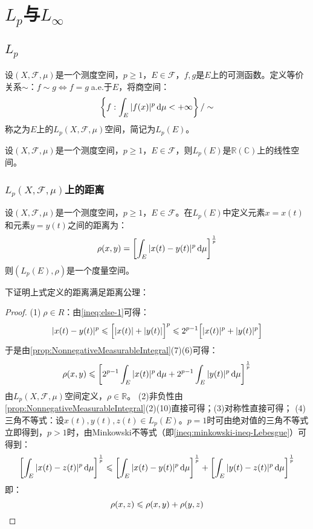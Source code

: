 \section{$L_p$与$L_{\infty}$}

\subsection{$L_p$}
\begin{definition}
	设$(X,\mathscr{F},\mu)$是一个测度空间，$p\geqslant1$，$E\in\mathscr{F}$，$f,g$是$E$上的可测函数。定义等价关系$\sim$：$f\sim g\Leftrightarrow f=g\;$a.e.于$E$，将商空间：
	\begin{equation*}
		\left\{f:\int_{E}|f(x)|^p\mathop{}\!\mathrm{d}\mu<+\infty\right\}/\sim
	\end{equation*}
	称之为$E$上的$L_p(X,\mathscr{F},\mu)$空间，简记为$L_p(E)$。
\end{definition}
\begin{property}\label{prop:Lp}
	设$(X,\mathscr{F},\mu)$是一个测度空间，$p\geqslant1$，$E\in\mathscr{F}$，则$L_p(E)$是$\mathbb{R}(\mathbb{C})$上的线性空间。
\end{property}
\subsubsection{$L_p(X,\mathscr{F},\mu)$上的距离}
\begin{definition}
	设$(X,\mathscr{F},\mu)$是一个测度空间，$p\geqslant1$，$E\in\mathscr{F}$。在$L_p(E)$中定义元素$x=x(t)$和元素$y=y(t)$之间的距离为：
	\begin{equation*}
		\rho(x,y)=\left[\int_{E}|x(t)-y(t)|^p\mathop{}\!\mathrm{d}\mu\right]^\frac{1}{p}
	\end{equation*}
	则$(L_p(E),\rho)$是一个度量空间。
\end{definition}
下证明上式定义的距离满足距离公理：
\begin{proof}
	(1)$\;\rho\in R$：由\cref{ineq:else-1}可得：
	\begin{equation*}
		|x(t)-y(t)|^p\leqslant\Bigl[|x(t)|+|y(t)|\Bigr]^p\leqslant2^{p-1}\Bigl[|x(t)|^p+|y(t)|^p\Bigr]
	\end{equation*}
	于是由\cref{prop:NonnegativeMeasurableIntegral}(7)(6)可得：
	\begin{equation*}
		\rho(x,y)\leqslant\left[2^{p-1}\int_{E}|x(t)|^p\mathop{}\!\mathrm{d}\mu+2^{p-1}\int_{E}|y(t)|^p\mathop{}\!\mathrm{d}\mu\right]^{\frac{1}{p}}
	\end{equation*}
	由$L_p(X,\mathscr{F},\mu)$空间定义，$\rho\in\mathbb{R}$。
	(2)非负性由\cref{prop:NonnegativeMeasurableIntegral}(2)(10)直接可得；(3)对称性直接可得；
	(4)三角不等式：设$x(t),y(t),z(t)\in L_p(E)$。$p=1$时可由绝对值的三角不等式立即得到，$p>1$时，由Minkowski不等式（即\cref{ineq:minkowski-ineq-Lebesgue}）可得到：
	\begin{equation*}
		\left[\int_{E}|x(t)-z(t)|^p\mathop{}\!\mathrm{d}\mu\right]^{\frac{1}{p}} \leqslant \left[\int_{E}|x(t)-y(t)|^p\mathop{}\!\mathrm{d}\mu\right]^{\frac{1}{p}} + \left[\int_{E}|y(t)-z(t)|^p\mathop{}\!\mathrm{d}\mu\right]^{\frac{1}{p}}
	\end{equation*}
	即：
	\begin{equation*}
		\rho(x,z)\leqslant\rho(x,y)+\rho(y,z)\qedhere
	\end{equation*}
\end{proof}
